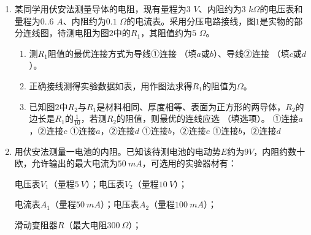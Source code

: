 \begin{enumerate}[leftmargin=0em]
\newpage
\item 
{}
某同学用伏安法测量导体的电阻，现有量程为$ 3 $ $ V $、内阻约为$ 3 $ $ k\Omega $的电压表和量程为$ 0..6 $ $ A $、内阻约为$ 0.1 $ $ \Omega $的电流表。采用分压电路接线，图$ 1 $是实物的部分连线图，待测电阻为图$ 2 $中的$ R_{1} $，其阻值约为$ 5 $ $ \Omega $。
\begin{figure}[h!]
\centering

\end{figure}

\begin{enumerate}
\renewcommand{\labelenumi}{\arabic{enumi}.}
\item
测$ R_{1} $阻值的最优连接方式为导线①连接 （填$ a $或$ b $）、导线②连接 （填$ c $或$ d $）。
\item 
正确接线测得实验数据如表，用作图法求得$ R_{1} $的阻值为$ \Omega $。


\item 
已知图$ 2 $中$ R_{2} $与$ R_{1} $是材料相同、厚度相等、表面为正方形的两导体，$ R_{2} $的边长是$ R_{1} $的$ \frac{1}{10} $，若测$ R_{2} $的阻值，则最优的连线应选 （填选项）。
\fourchoices
{①连接$ a $，②连接$ c $}
{①连接$ a $，②连接$ d $}
{①连接$ b $，②连接$ c $}
{①连接$ b $，②连接$ d $}




\end{enumerate}







\item 
{}
用伏安法测量一电池的内阻。已知该待测电池的电动势$ E $约为$ 9V $，内阻约数十欧，允许输出的最大电流为$ 50\ mA $，可选用的实验器材有：

\begin{minipage}[h!]{0.7\linewidth}
\vspace{0.3em}
电压表$ V_{1} $（量程$ 5\ V $）；电压表$ V_{2} $（量程$ 10\ V $）；

电流表$ A_{1} $（量程$ 50\ mA $）；电压表$ A_{2} $（量程$ 100\ mA $）；

滑动变阻器$ R $（最大电阻$ 300 \ \Omega $）；


\end{minipage}
\end{enumerate}
